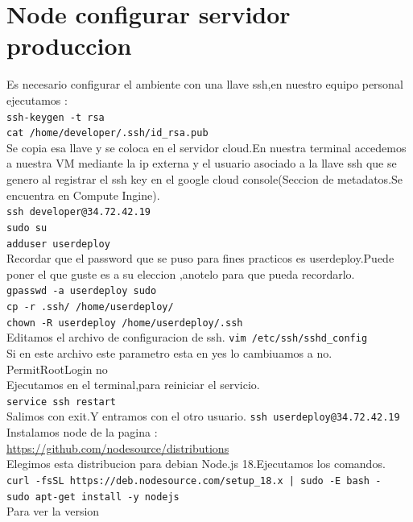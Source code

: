 \chapter{Node configurar servidor produccion}
Es necesario configurar el ambiente con una llave ssh,en nuestro equipo personal ejecutamos :\\
\texttt{ssh-keygen -t rsa}\\
\texttt{cat /home/developer/.ssh/id\_rsa.pub}\\
Se copia esa llave y se coloca en el servidor cloud.En nuestra terminal accedemos a nuestra
VM mediante la ip externa y  el usuario asociado a la llave ssh que se genero al registrar el 
ssh key en el google cloud console(Seccion de metadatos.Se encuentra en Compute Ingine).\\
\texttt{ssh developer@34.72.42.19}\\
\texttt{sudo su}\\
\texttt{adduser userdeploy}\\
Recordar que el password que se puso para fines practicos es userdeploy.Puede poner el que
guste es a su eleccion ,anotelo para que pueda recordarlo.\\
\texttt{gpasswd -a userdeploy sudo}\\
\texttt{cp -r .ssh/ /home/userdeploy/}\\
\texttt{chown -R userdeploy /home/userdeploy/.ssh}\\
Editamos el archivo de configuracion de ssh.
\texttt{vim /etc/ssh/sshd\_config}\\
Si en este archivo este parametro esta en yes lo cambiuamos a no.\\
PermitRootLogin no\\
Ejecutamos en el terminal,para reiniciar el servicio.\\
\texttt{service ssh restart}\\
Salimos  con exit.Y entramos con el otro usuario.
\texttt{ssh  userdeploy@34.72.42.19}\\
Instalamos node de la pagina :\\
\url{ https://github.com/nodesource/distributions}\\
Elegimos esta distribucion para debian Node.js 18.Ejecutamos los comandos.\\
\texttt{curl -fsSL https://deb.nodesource.com/setup\_18.x | sudo -E bash - }\\
\texttt{sudo apt-get install -y nodejs}\\
Para ver la version\\
